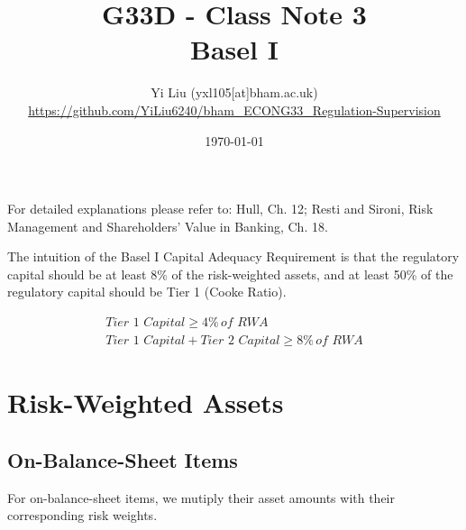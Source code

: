 \documentclass[12pt]{article}
\author{Yi Liu (yxl105[at]bham.ac.uk)\\\scriptsize{\url{https://github.com/YiLiu6240/bham_ECONG33_Regulation-Supervision}}}
\date{\today}
\title{G33D - Class Note 3\\Basel I}
\begin{document}
\maketitle

For detailed explanations please refer to: Hull, Ch. 12; Resti and Sironi, Risk Management and Shareholders’ Value in Banking, Ch. 18.

The intuition of the Basel I Capital Adequacy Requirement is that the regulatory capital should be at least 8\% of the risk-weighted assets, and at least 50\% of the regulatory capital should be Tier 1 (Cooke Ratio).

\begin{align*}
  \textit{Tier 1 Capital} \geq 4\% \, \textit{of RWA} \\
  \textit{Tier 1 Capital} + \textit{Tier 2 Capital} \geq 8\% \, \textit{of RWA}
\end{align*}

\tableofcontents

\section*{Risk-Weighted Assets}

\subsection{On-Balance-Sheet Items}

For on-balance-sheet items, we mutiply their asset amounts with their corresponding risk weights.
\end{document}
